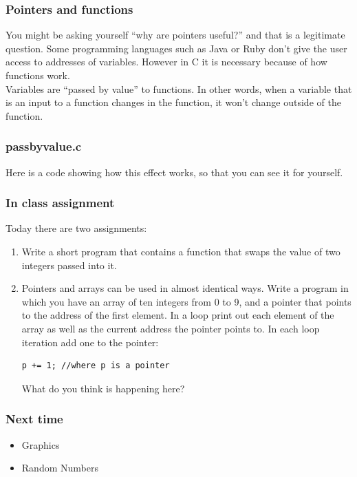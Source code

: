 \documentclass{beamer}
\begin{document}
\begin{frame}[fragile]
  \frametitle{Pointers and functions}
  You might be asking yourself ``why are pointers useful?'' and that
  is a legitimate question. Some programming languages such as Java
  or Ruby don't give the user access to addresses of variables.
  However in C it is necessary because of how functions work.\\
  \vspace{12pt}
  Variables are ``passed by value'' to functions. In other words,
  when a variable that is an input to a function changes in the
  function, it won't change outside of the function.
\end{frame}

\begin{frame}
  \frametitle{passbyvalue.c}
  Here is a code showing how this effect works, so that you can see
  it for yourself.
  
\end{frame}

\begin{frame}[fragile]
  \frametitle{In class assignment}
  Today there are two assignments:
  \begin{enumerate}
  \item Write a short program that contains a function that swaps the value
    of two integers passed into it.
  \item Pointers and arrays can be used in almost identical ways. 
    Write a program in which you have an array of ten integers from 0 to 9,
    and a pointer that points to the address of the first element.
    In a loop print out each element of the array as well as the current
    address the pointer points to. 
    In each loop iteration add one to the pointer:
    \begin{lstlisting}[style=customc]
      p += 1; //where p is a pointer
    \end{lstlisting}
    What do you think is happening here?
  \end{enumerate}
\end{frame}

\begin{frame}
  \frametitle{Next time}
  \begin{itemize}
    \item Graphics
    \item Random Numbers
  \end{itemize}
\end{frame}
\end{document}
